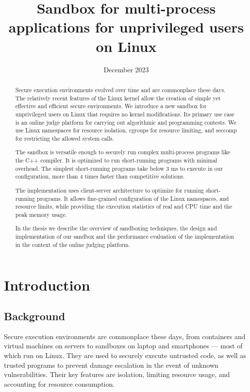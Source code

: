 \documentclass[en]{pracamgr}
\title{Sandbox for multi-process applications for unprivileged users on Linux}
\date{December 2023}
\begin{document}
\renewcommand\textfraction{0}

\maketitle

\begin{abstract}
Secure execution environments evolved over time and are commonplace these days. The relatively recent features of the Linux kernel allow the creation of simple yet effective and efficient secure environments. We introduce a new sandbox for unprivileged users on Linux that requires no kernel modifications. Its primary use case is an online judge platform for carrying out algorithmic and programming contests. We use Linux namespaces for resource isolation, cgroups for resource limiting, and seccomp for restricting the allowed system calls.

The sandbox is versatile enough to securely run complex multi-process programs like the C++ compiler. It is optimized to run short-running programs with minimal overhead. The simplest short-running programs take below 3 ms to execute in our configuration, more than 4 times faster than competitive solutions.

The implementation uses client-server architecture to optimize for running short-running programs. It allows fine-grained configuration of the Linux namespaces, and resource limits, while providing the execution statistics of real and CPU time and the peak memory usage.

In the thesis we describe the overview of sandboxing techniques, the design and implementation of our sandbox and the performance evaluation of the implementation in the context of the online judging platform.

\end{abstract}

\tableofcontents

\chapter{Introduction}\label{chapter:introduction}

\section{Background}

Secure execution environments are commonplace these days, from containers and virtual machines on servers to sandboxes on laptop and smartphones --- most of which run on Linux. They are used to securely execute untrusted code, as well as trusted programs to prevent damage escalation in the event of unknown vulnerabilities. Their key features are isolation, limiting resource usage, and accounting for resource consumption.
\end{document}

